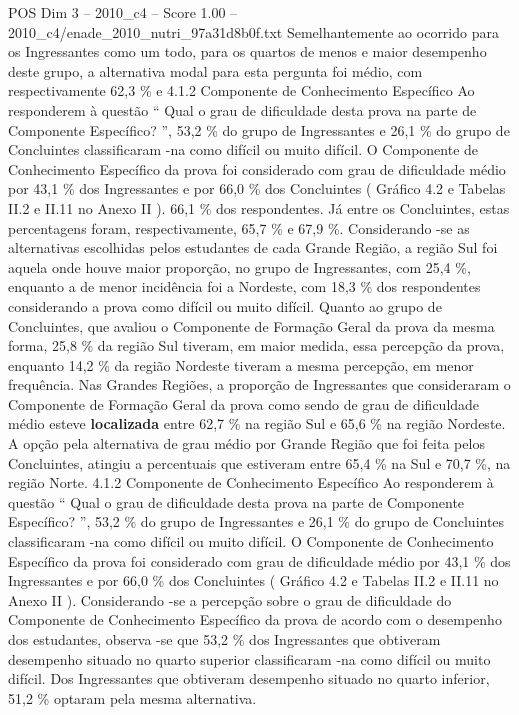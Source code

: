 \begin{textsample}{POS Dim 3 – 2010\_c4 – Score 1.00 – 2010\_c4/enade\_2010\_nutri\_97a31d8b0f.txt}
Semelhantemente ao ocorrido para os Ingressantes como um todo, para os quartos de menos e maior desempenho deste grupo, a alternativa modal para esta pergunta foi médio, com respectivamente 62,3 \% e 4.1.2 Componente de Conhecimento Específico Ao responderem à questão “ Qual o grau de dificuldade desta prova na parte de Componente Específico? ”, 53,2 \% do grupo de Ingressantes e 26,1 \% do grupo de Concluintes classificaram -na como difícil ou muito difícil.
O Componente de Conhecimento Específico da prova foi considerado com grau de dificuldade médio por 43,1 \% dos Ingressantes e por 66,0 \% dos Concluintes ( Gráfico 4.2 e Tabelas II.2 e II.11 no Anexo II ). 66,1 \% dos respondentes.
Já entre os Concluintes, estas percentagens foram, respectivamente, 65,7 \% e 67,9 \%.
Considerando -se as alternativas escolhidas pelos estudantes de cada Grande Região, a região Sul foi aquela onde houve maior proporção, no grupo de Ingressantes, com 25,4 \%, enquanto a de menor incidência foi a Nordeste, com 18,3 \% dos respondentes considerando a prova como difícil ou muito difícil.
Quanto ao grupo de Concluintes, que avaliou o Componente de Formação Geral da prova da mesma forma, 25,8 \% da região Sul tiveram, em maior medida, essa percepção da prova, enquanto 14,2 \% da região Nordeste tiveram a mesma percepção, em menor frequência.
Nas Grandes Regiões, a proporção de Ingressantes que consideraram o Componente de Formação Geral da prova como sendo de grau de dificuldade médio esteve \textbf{localizada} entre 62,7 \% na região Sul e 65,6 \% na região Nordeste.
A opção pela alternativa de grau médio por Grande Região que foi feita pelos Concluintes, atingiu a percentuais que estiveram entre 65,4 \% na Sul e 70,7 \%, na região Norte. 4.1.2 Componente de Conhecimento Específico Ao responderem à questão “ Qual o grau de dificuldade desta prova na parte de Componente Específico? ”, 53,2 \% do grupo de Ingressantes e 26,1 \% do grupo de Concluintes classificaram -na como difícil ou muito difícil.
O Componente de Conhecimento Específico da prova foi considerado com grau de dificuldade médio por 43,1 \% dos Ingressantes e por 66,0 \% dos Concluintes ( Gráfico 4.2 e Tabelas II.2 e II.11 no Anexo II ).
Considerando -se a percepção sobre o grau de dificuldade do Componente de Conhecimento Específico da prova de acordo com o desempenho dos estudantes, observa -se que 53,2 \% dos Ingressantes que obtiveram desempenho situado no quarto superior classificaram -na como difícil ou muito difícil.
Dos Ingressantes que obtiveram desempenho situado no quarto inferior, 51,2 \% optaram pela mesma alternativa.

\end{textsample}
